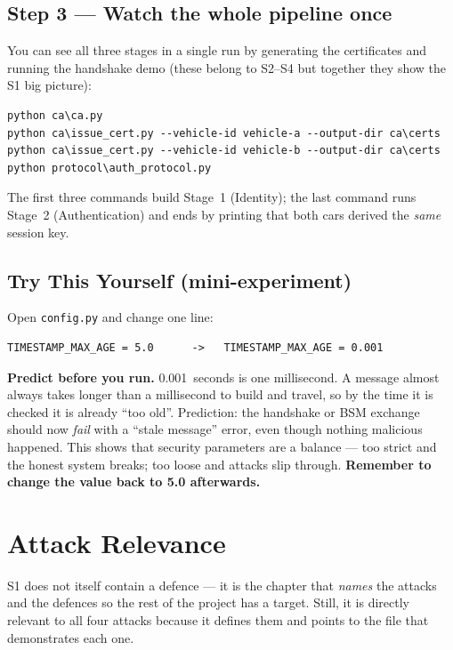 \documentclass[11pt,a4paper]{article}
\begin{document}
\subsection{Step 3 --- Watch the whole pipeline once}
You can see all three stages in a single run by generating the certificates and
running the handshake demo (these belong to S2--S4 but together they show the
S1 big picture):
\begin{lstlisting}[style=term]
python ca\ca.py
python ca\issue_cert.py --vehicle-id vehicle-a --output-dir ca\certs
python ca\issue_cert.py --vehicle-id vehicle-b --output-dir ca\certs
python protocol\auth_protocol.py
\end{lstlisting}
The first three commands build Stage~1 (Identity); the last command runs
Stage~2 (Authentication) and ends by printing that both cars derived the
\emph{same} session key.

\subsection{Try This Yourself (mini-experiment)}
Open \texttt{config.py} and change one line:
\begin{lstlisting}[style=term]
TIMESTAMP_MAX_AGE = 5.0      ->   TIMESTAMP_MAX_AGE = 0.001
\end{lstlisting}
\textbf{Predict before you run.} 0.001~seconds is one millisecond. A message
almost always takes longer than a millisecond to build and travel, so by the
time it is checked it is already ``too old''. Prediction: the handshake or BSM
exchange should now \emph{fail} with a ``stale message'' error, even though
nothing malicious happened. This shows that security parameters are a balance ---
too strict and the honest system breaks; too loose and attacks slip through.
\textbf{Remember to change the value back to 5.0 afterwards.}

\section{Attack Relevance}

S1 does not itself contain a defence --- it is the chapter that \emph{names} the
attacks and the defences so the rest of the project has a target. Still, it is
directly relevant to all four attacks because it defines them and points to the
file that demonstrates each one.
\end{document}
